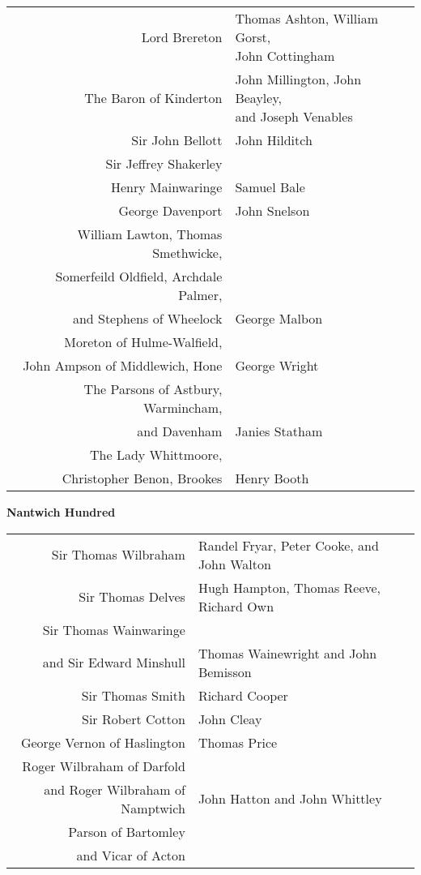 \begin{center}
  \small
  \begin{tabular}{rl}
    Lord Brereton & \makecell[l]{Thomas Ashton, William Gorst, \\ John Cottingham} \\
    The Baron of Kinderton & \makecell[l]{John Millington, John Beayley, \\ and Joseph Venables} \\
    Sir John Bellott & John Hilditch \\
    Sir Jeffrey Shakerley & \dotfill \\
    Henry Mainwaringe & Samuel Bale \\
    George Davenport & John Snelson \\
    William Lawton, Thomas Smethwicke, \\ Somerfeild Oldfield, Archdale Palmer, \\ and Stephens of Wheelock & George Malbon \\
    Moreton of Hulme-Walfield, \\ John Ampson of Middlewich, Hone & George Wright \\
    The Parsons of Astbury, Warmincham, \\ and Davenham & Janies Statham \\
    The Lady Whittmoore, \\ Christopher Benon, Brookes & Henry Booth \\
  \end{tabular}
\end{center}

\begin{center}
  \Large
  \textbf{Nantwich Hundred}
\end{center}

\begin{center}
  \small
  \begin{tabular}{rl}
    Sir Thomas Wilbraham & Randel Fryar, Peter Cooke, and John Walton \\
    Sir Thomas Delves & Hugh Hampton, Thomas Reeve, Richard Own \\
    Sir Thomas Wainwaringe \\ and Sir Edward Minshull & Thomas Wainewright and John Bemisson \\
    Sir Thomas Smith & Richard Cooper \\
    Sir Robert Cotton & John Cleay \\
    George Vernon of Haslington & Thomas Price \\
    Roger Wilbraham of Darfold \\ and Roger Wilbraham of Namptwich & John Hatton and John Whittley \\
    Parson of Bartomley \\ and Vicar of Acton & \dotfill \\
  \end{tabular}
\end{center}

